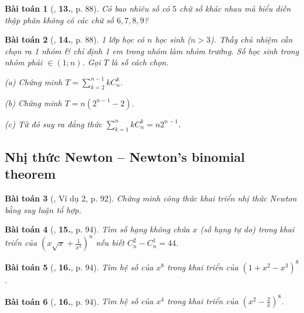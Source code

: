 \documentclass{article}
\numberwithin{equation}{section}
\newtheorem{baitoan}{Bài toán}[section]
\begin{document}
\begin{baitoan}[\cite{TL_chuyen_Toan_Dai_So_Giai_Tich_11}, \textbf{13.}, p. 88]
	Có bao nhiêu số có $5$ chữ số khác nhau mà biểu diễn thập phân không có các chữ số $6,7,8,9$?
\end{baitoan}

\begin{baitoan}[\cite{TL_chuyen_Toan_Dai_So_Giai_Tich_11}, \textbf{14.}, p. 88]
	1 lớp học có $n$ học sinh ($n > 3$). Thầy chủ nhiệm cần chọn ra 1 nhóm \& chỉ định 1 em trong nhóm làm nhóm trưởng. Số học sinh trong nhóm phải $\in(1;n)$. Gọi $T$ là số cách chọn.
	\begin{enumerate*}
		\item[(a)] Chứng minh $T = \sum_{k=2}^{n-1} kC_n^k$.
		\item[(b)] Chứng minh $T = n\left(2^{n-1} - 2\right)$.
		\item[(c)] Từ đó suy ra đẳng thức $\sum_{k=1}^n kC_n^k = n2^{n-1}$.
	\end{enumerate*}
\end{baitoan}


\subsection{Nhị thức Newton -- Newton's binomial theorem}

\begin{baitoan}[\cite{TL_chuyen_Toan_Dai_So_Giai_Tich_11}, Ví dụ 2, p. 92]
	Chứng minh công thức khai triển nhị thức Newton bằng suy luận tổ hợp.
\end{baitoan}

\begin{baitoan}[\cite{TL_chuyen_Toan_Dai_So_Giai_Tich_11}, \textbf{15.}, p. 94]
	Tìm số hạng không chứa $x$ (số hạng tự do) trong khai triển của $\left(x\sqrt{x} + \frac{1}{x^4}\right)^n$ nếu biết $C_n^2 - C_n^1 = 44$.
\end{baitoan}

\begin{baitoan}[\cite{TL_chuyen_Toan_Dai_So_Giai_Tich_11}, \textbf{16.}, p. 94]
	Tìm hệ số của $x^8$ trong khai triển của $(1 + x^2 - x^3)^8$.
\end{baitoan}

\begin{baitoan}[\cite{TL_chuyen_Toan_Dai_So_Giai_Tich_11}, \textbf{16.}, p. 94]
	Tìm hệ số của $x^4$ trong khai triển của $\left(x^2 - \frac{2}{x}\right)^8$.
\end{baitoan}
\end{document}
